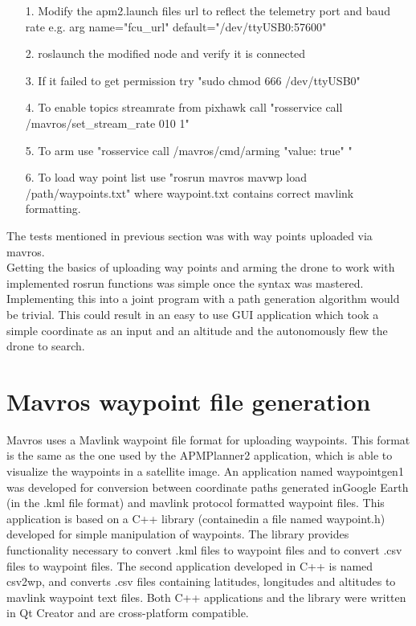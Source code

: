 \begin{itemize}

\item[1.] Modify the apm2.launch files url to reflect the telemetry port and baud rate e.g. arg
name="fcu\_url" default="/dev/ttyUSB0:57600"
\item[2.] roslaunch the modified node and verify it is connected
\item[3.] If it failed to get permission try "sudo chmod 666 /dev/ttyUSB0"
\item[4.] To enable topics streamrate from pixhawk call "rosservice call /mavros/set\_stream\_rate
010 1"
\item[5.] To arm use "rosservice call /mavros/cmd/arming "value: true" "
\item[6.] To load way point list use "rosrun mavros mavwp load /path/waypoints.txt" where
waypoint.txt contains correct mavlink formatting.

\end{itemize}

The tests mentioned in previous section was with way points uploaded via mavros.\\
Getting the basics of uploading way points and arming the drone to work with implemented rosrun
functions was simple once the syntax was mastered. Implementing this into a joint program with a
path generation algorithm would be trivial. This could result in an easy to use GUI application
which took a simple coordinate as an input and an altitude and the autonomously flew the drone to
search.\\

\section{Mavros waypoint file generation}
Mavros uses a Mavlink waypoint file format for uploading waypoints.
This format is the same as the one used by the APMPlanner2 application,
which is able to visualize the waypoints in a satellite image.
An application named waypointgen1 was developed for conversion between coordinate paths generated
inGoogle Earth (in the .kml file format)
and mavlink protocol formatted waypoint files. This application is based on a C++ library
(containedin a file named waypoint.h)
developed for simple manipulation of waypoints. The library provides functionality necessary to
convert .kml files to waypoint files
and to convert .csv files to waypoint files.
The second application developed in C++ is named csv2wp, and converts .csv files containing
latitudes, longitudes and altitudes to mavlink waypoint text files.
Both C++ applications and the library were written in Qt Creator and are cross-platform compatible.

